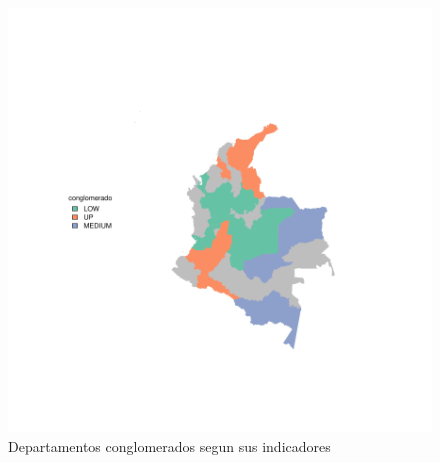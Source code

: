 \documentclass{article}
\begin{document}
\begin{figure}[h]
\centering

\includegraphics{ProyectoFInal-plotMap1}

\caption{Departamentos conglomerados segun sus indicadores}\label{clustmap}
\end{figure}



\renewcommand{\refname}{Bibliografía}

\end{document}
